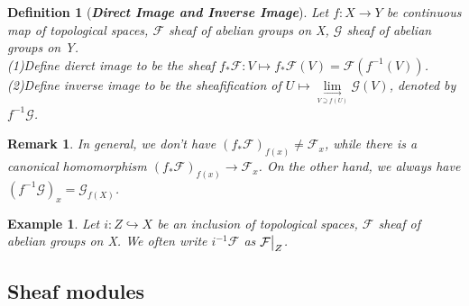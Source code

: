 \documentclass{ctexart}
\newtheorem{definition}{Definition}[section]
\newtheorem{remark}{Remark}[section]
\newtheorem{example}{Example}[section]
\begin{document}
\begin{definition}[\textbf{\emph{Direct Image and Inverse Image}}]
    Let $f:X \longrightarrow Y$ be continuous map of topological spaces, $\mathcal{F}$ sheaf of abelian groups on X, $\mathcal{G}$ sheaf of abelian groups on Y. \\
    (1)Define dierct image to be the sheaf $f_{\ast}\mathcal{F}: V \longmapsto f_{\ast}\mathcal{F}(V) = \mathcal{F}(f^{-1}(V))$. \\
    (2)Define inverse image to be the sheafification of $U \longmapsto \underset{\underset{V \supseteq f(U)}{\longrightarrow}}{\lim} \mathcal{G}(V)$, denoted by $f^{-1}\mathcal{G}$.
\end{definition}
\begin{remark}
    In general, we don't have $(f_{\ast}\mathcal{F})_{f(x)} \neq \mathcal{F}_{x}$,
    while there is a canonical homomorphism $(f_{\ast}\mathcal{F})_{f(x)} \longrightarrow \mathcal{F}_{x}$.
    On the other hand, we always have $(f^{-1}\mathcal{G})_{x} = \mathcal{G}_{f(X)}$.
\end{remark}
\begin{example}
    Let $i: Z \hookrightarrow X$ be an inclusion of topological spaces, $\mathcal{F}$ sheaf of abelian groups on X.
    We often write $i^{-1}\mathcal{F}$ as $\mathcal{F}\big{|}_{Z}$.
\end{example}

\subsection{Sheaf modules}
\label{subsection:Vector_Bundles_Sheaf_modules}
\end{document}
